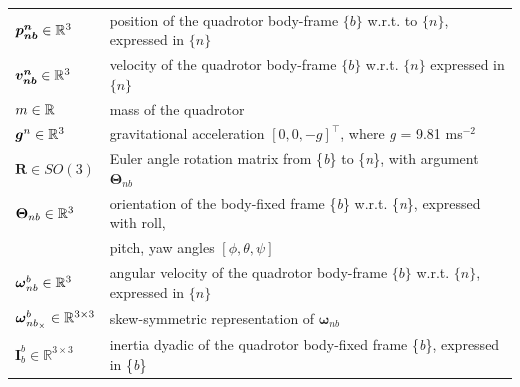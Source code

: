 \begin{table}[h]
    \centering
    \begin{tabular}{ll}
        $\boldsymbol{p^n_{nb}} \in \mathbb{R}^3$        & position of the quadrotor body-frame $\{b\}$ w.r.t. to $\{n\}$, expressed in $\{n\}$ \vspace{0.8mm} \\
        
        $\boldsymbol{v^n_{nb}} \in \mathbb{R}^3$        & velocity of the quadrotor body-frame $\{b\}$ w.r.t. $\{n\}$ expressed in $\{n\}$ \vspace{0.8mm} \\
        
        $m \in \mathbb{R}$                              & mass of the quadrotor \vspace{0.8mm} \\
        
        $\boldsymbol{g}^n \in \mathbb{R}^3$             &  gravitational acceleration $[0, 0, -g]^\top$, where \textit{g} = 9.81  ms$^{-2}$\vspace{0.8mm} \\
        
        $\boldsymbol{R} \in SO(3)$              & Euler angle rotation matrix from \{\textit{b}\} to \{\textit{n}\}, with argument $\boldsymbol{\Theta}_{nb}$ \vspace{0.8mm} \\
        
        $\boldsymbol{\Theta}_{nb} \in \mathbb{R}^3$     & orientation of the body-fixed frame \{\textit{b}\} w.r.t. \{\textit{n}\}, expressed with roll, \\ &pitch, yaw angles $[\phi, \theta,\psi]$ \vspace{0.8mm} \\
        
        $\boldsymbol{\omega}^b_{nb} \in \mathbb{R}^3$   & angular velocity of the quadrotor  body-frame $\{b\}$ w.r.t. $\{n\}$, expressed in $\{n\}$ \vspace{0.8mm} \\ 
        
        $\boldsymbol{\omega}^b_{nb_\times} \in \mathbb{R}^{3\times3}$ & skew-symmetric representation of $\boldsymbol{\omega}_{nb}$ \vspace{0.8mm} \\
        
        $\boldsymbol{I}^b_b \in \mathbb{R}^{3\times3}$ & inertia dyadic of the quadrotor body-fixed frame \{\textit{b}\}, expressed in \{\textit{b}\} \vspace{0.8mm} \\
        

\end{tabular}
\end{table}
